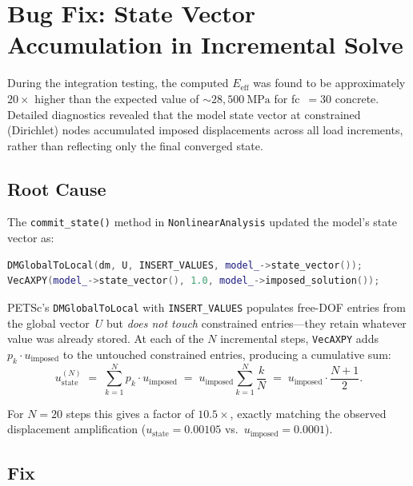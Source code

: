 \section{Bug Fix: State Vector Accumulation in Incremental Solve}
\label{sec:reinf-bugfix}

During the integration testing, the computed $E_{\text{eff}}$ was found
to be approximately $20{\times}$ higher than the expected value of
${\sim}28{,}500~\mathrm{MPa}$ for fc~$=30$ concrete.  Detailed diagnostics
revealed that the model state vector at constrained (Dirichlet) nodes
accumulated imposed displacements across all load increments, rather than
reflecting only the final converged state.

\subsection{Root Cause}

The \texttt{commit\_state()} method in \texttt{NonlinearAnalysis} updated the
model's state vector as:

\begin{lstlisting}[language=C++, basicstyle=\ttfamily\small]
DMGlobalToLocal(dm, U, INSERT_VALUES, model_->state_vector());
VecAXPY(model_->state_vector(), 1.0, model_->imposed_solution());
\end{lstlisting}

PETSc's \texttt{DMGlobalToLocal} with \texttt{INSERT\_VALUES} populates
free-DOF entries from the global vector~$U$ but \emph{does not touch}
constrained entries---they retain whatever value was already stored.
At each of the $N$ incremental steps, \texttt{VecAXPY} adds
$p_k \cdot u_{\text{imposed}}$ to the untouched constrained entries,
producing a cumulative sum:
\begin{equation}
  u_{\text{state}}^{(N)} \;=\;
    \sum_{k=1}^{N} p_k \cdot u_{\text{imposed}}
  \;=\; u_{\text{imposed}} \sum_{k=1}^{N} \frac{k}{N}
  \;=\; u_{\text{imposed}} \cdot \frac{N+1}{2}.
  \label{eq:accumulation}
\end{equation}

For $N = 20$ steps this gives a factor of $10.5{\times}$, exactly matching
the observed displacement amplification ($u_{\text{state}} = 0.00105$
vs.\ $u_{\text{imposed}} = 0.0001$).

\subsection{Fix}

